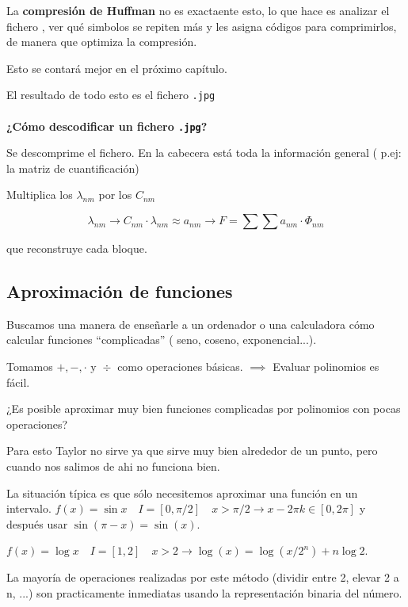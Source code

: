 			La \textbf{compresión de Huffman} no es exactaente esto, lo que hace es analizar el fichero , ver qué simbolos se repiten más y les asigna códigos para comprimirlos, de manera que optimiza la compresión.

			Esto se contará mejor en el próximo capítulo.


			El resultado de todo esto es el fichero \texttt{.jpg}\\\\


			\textbf{¿Cómo descodificar un  fichero \texttt{.jpg}?}
			
			Se descomprime el fichero. En la cabecera está toda la información general ( p.ej: la matriz de cuantificación)
			
			Multiplica los $\lambda_{nm}$ por los $C_{nm}$
			
			$$\lambda_{nm} \rightarrow C_{nm}\cdot \lambda_{nm} \approx a_{nm} \rightarrow F = \sum \sum a_{nm} \cdot \Phi_{nm}$$
			
			que reconstruye cada bloque.
	
	\subsection{Aproximación de funciones}

		Buscamos una manera de enseñarle a un ordenador o una calculadora cómo calcular funciones ``complicadas'' ( seno, coseno, exponencial...).


		Tomamos $ +,-, \cdot \text{ y } \div$ como operaciones básicas. $\implies$ Evaluar polinomios es fácil.

		¿Es posible aproximar muy bien funciones complicadas por polinomios con pocas operaciones?


		Para esto Taylor no sirve ya que sirve muy bien alrededor de un punto, pero cuando nos salimos de ahi no funciona bien.




		La situación típica es que sólo necesitemos aproximar una función en un intervalo.
		$f(x) = \sin x \quad I= [0, \pi/2] \quad x > \pi/2 \rightarrow x - 2\pi k \in [0, 2\pi]$ y después usar $\sin (\pi - x) = \sin (x)$.

		$f(x) = \log x \quad I= [1, 2] \quad x > 2 \rightarrow \log (x) = \log(x / 2^n) + n \log 2$.

		La mayoría de operaciones realizadas por este método (dividir entre 2, elevar 2 a n, ...) son practicamente inmediatas usando la representación binaria del número.



